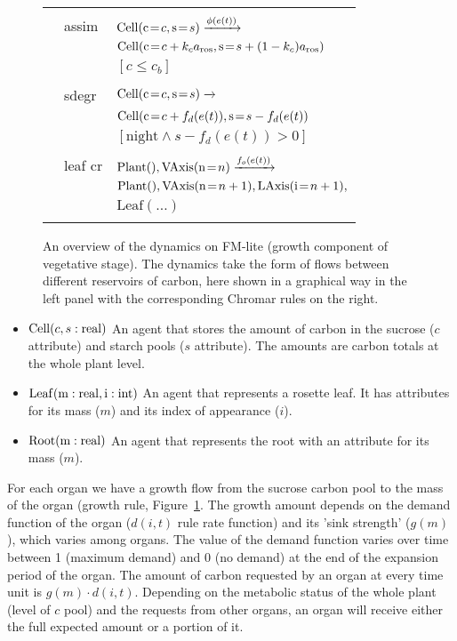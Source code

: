 \begin{figure}[p]
{\begin{tabularx}{1.1\textwidth}{c|ll}
\addlinespace[-0.5em]
& & \\
& \textsf{assim} & $\mathrm{Cell}(\mathrm{c} \! = \! {c}, \mathrm{s} \! = \! {s}) \xrightarrow{\phi(e(t))}$ \\
& & $\mathrm{Cell}(\mathrm{c} \! = \! {c+k_c a_{\mathrm{ros}}}, \mathrm{s} \! = \! {s+(1-k_c) a_{\mathrm{ros}}}) $ \\
& & $[c \leq c_b]$ \\
\addlinespace[-0.5em]
& & \\
& \textsf{sdegr} & $\mathrm{Cell}(\mathrm{c} \! = \! {c}, \mathrm{s} \! = \! {s}) \xrightarrow{}$ \\ 
& & $\mathrm{Cell}(\mathrm{c} \! = \! {c+f_d(e(t)}), \mathrm{s} \! = \! {s-f_d(e(t)})$ \\
& & $[\mathrm{night} \land s-f_d(e(t)) > 0]$ \\ 
\addlinespace[-0.5em]
& & \\
& \textsf{leaf cr} & $\mathrm{Plant}(), \mathrm{VAxis}(\mathrm{n} \! = \! {n}) \xrightarrow{f_o(e(t))} $ \\ 
& & $\mathrm{Plant}(), \mathrm{VAxis}(\mathrm{n} \! = \! {n+1}), \mathrm{LAxis}(\mathrm{i} \! = \! {n+1}),$ \\
& & $\mathrm{Leaf}(\dots)$ \\
\addlinespace[0.25cm]
\bottomrule
\end{tabularx}} %
\caption{An overview of the dynamics on FM-lite (growth component of vegetative
  stage). The dynamics take the form of flows between different reservoirs of
  carbon, here shown in a graphical way in the left panel with the corresponding
  Chromar rules on the right.  }
\label{fig:fmv1}
\end{figure}
%
\begin{itemize}
\item
  \(\mathrm{Cell}(c,s:\mathrm{real})\) An agent that stores the amount of
  carbon in the sucrose (\(c\) attribute) and starch pools (\(s\)
  attribute). The amounts are carbon totals at the whole plant level.
\item
  \(\mathrm{Leaf}(\mathrm{m}:\mathrm{real},\mathrm{i}:\mathrm{int})\) An agent that represents a
  rosette leaf. It has attributes for its mass (\(m\)) and its index of
  appearance (\(i\)).
\item
  \(\mathrm{Root}(\mathrm{m}:\mathrm{real})\) An agent that represents the root with
  an attribute for its mass (\(m\)).
\end{itemize}

For each organ we have a growth flow from the sucrose carbon pool to the mass of
the organ (\textsf{growth} rule, Figure~\ref{fig:fmv1}. The growth amount
depends on the demand function of the organ (\(d(i,t)\) rule rate function) and
its 'sink strength' (\(g(m)\)), which varies among organs. The value of the
demand function varies over time between 1 (maximum demand) and 0 (no demand) at
the end of the expansion period of the organ. The amount of carbon requested by
an organ at every time unit is \(g( m ) \cdot d(i,t)\). Depending on the
metabolic status of the whole plant (level of \(c\) pool) and the requests from
other organs, an organ will receive either the full expected amount or a portion
of it.

